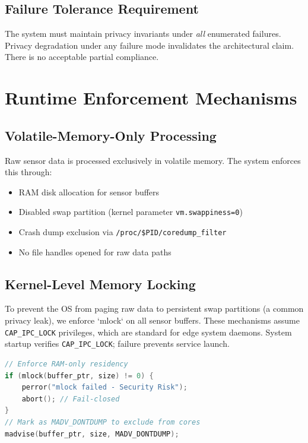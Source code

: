 \documentclass[conference]{IEEEtran}
\begin{document}
\subsection{Failure Tolerance Requirement}
The system must maintain privacy invariants under \textit{all} enumerated failures. Privacy degradation under any failure mode invalidates the architectural claim. There is no acceptable partial compliance.

\section{Runtime Enforcement Mechanisms}

\subsection{Volatile-Memory-Only Processing}
Raw sensor data is processed exclusively in volatile memory. The system enforces this through:
\begin{itemize}
    \item RAM disk allocation for sensor buffers
    \item Disabled swap partition (kernel parameter \texttt{vm.swappiness=0})
    \item Crash dump exclusion via \texttt{/proc/\$PID/coredump\_filter}
    \item No file handles opened for raw data paths
\end{itemize}

\subsection{Kernel-Level Memory Locking}
To prevent the OS from paging raw data to persistent swap partitions (a common privacy leak), we enforce `mlock` on all sensor buffers. These mechanisms assume \texttt{CAP\_IPC\_LOCK} privileges, which are standard for edge system daemons. System startup verifies \texttt{CAP\_IPC\_LOCK}; failure prevents service launch.

\begin{lstlisting}[language=C, caption={Kernel Locking Strategy}]
// Enforce RAM-only residency
if (mlock(buffer_ptr, size) != 0) {
    perror("mlock failed - Security Risk");
    abort(); // Fail-closed
}
// Mark as MADV_DONTDUMP to exclude from cores
madvise(buffer_ptr, size, MADV_DONTDUMP);
\end{lstlisting}
\end{document}
